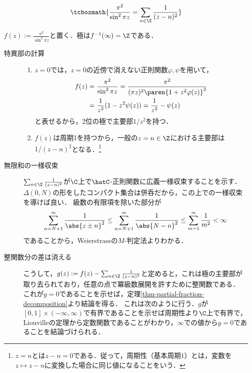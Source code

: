 \documentclass[uplatex, dvipdfmx]{jsreport}
\begin{document}
\begin{proposition}[自乗のものは解きやすい]\label{prop-partial-fractional-decomposition}
    \[\tcboxmath{\frac{\pi^2}{\sin^2\pi z}=\sum_{n\in\Z}\frac{1}{(z-n)^2}}\]
\end{proposition}
\begin{Proof}
    $f(z):=\frac{\pi^2}{\sin^2\pi z}$と置く．極は$f^{-1}(\infty)=\Z$である．
    \begin{description}
        \item[特異部の計算] \mbox{}
            \begin{enumerate}
                \item $z=0$では，$z=0$の近傍で消えない正則関数$\varphi,\psi$を用いて，
                \begin{align*}
                    f(z)&=\frac{\pi^2}{\sin^2\pi z}=\frac{\pi^2}{(\pi z)^2\paren{1+z^2\varphi(z)}^2}\\
                    &=\frac{1}{z^2}(1-z^2\psi(z))=\frac{1}{z^2}-\psi(z)
                \end{align*}
                と表せるから，2位の極で主要部$1/z^2$を持つ．
                \item $f(z)$は周期1を持つから，一般の$z=n\in\Z$における主要部は$1/(z-n)^2$となる．\footnote{$z=n$とは$z-n=0$である．従って，周期性（基本周期$1$）とは，変数を$z\mapsto z-n$に変換した場合に同じ値になることをいう．}
            \end{enumerate}
        \item[無限和の一様収束] \mbox{}
            $\sum_{n\in\Z}\frac{1}{(z-n)^2}$が$\C$上で$\hatC$-正則関数に広義一様収束することを示す．
            $\Delta(0,N)$の形をしたコンパクト集合は併呑だから，この上での一様収束を導けば良い．
            級数の有限項を除いた部分が
            \[\sum^\infty_{n=N+1}\frac{1}{\abs{z\pm n}^2}\le\sum^\infty_{n=N+1}\frac{1}{\abs{N-n}^2}\le\sum^\infty_{m=1}\frac{1}{m^2}<\infty\]
            であることから，Weierstrassの$M$-判定法よりわかる．
        \item[整関数分の差は消える]
            こうして，$g(z):=f(z)-\sum_{n\in\Z}\frac{1}{(z-n)^2}$と定めると，これは極の主要部が取り去られており，任意の点で冪級数展開を許すために整関数である．
            これが$g=0$であることを示せば，定理\ref{thm-partial-fraction-decomposition}より結論を得る．
            これは次のように行う．$g$が$[0,1]\times(-\infty,\infty)$で有界であることを示せば周期性より$\C$上で有界で，Liouvilleの定理から定数関数であることがわかり，$\infty$での値から$g=0$であることを結論づけられる．
            \begin{enumerate}

\end{enumerate}
\end{description}
\end{Proof}
\end{document}
